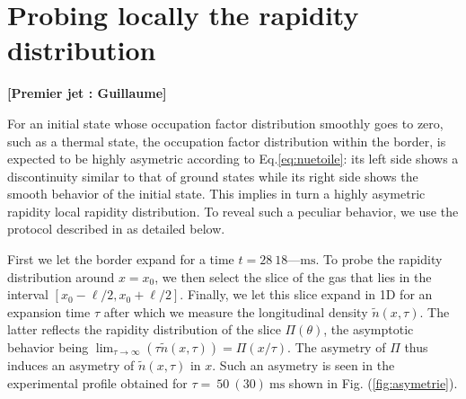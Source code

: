 \documentclass[submission, Phys]{SciPost}
\begin{document}
\section{Probing locally the rapidity distribution}
{\bf [Premier jet : Guillaume]}
\label{sec:local}

\def\OliveGreen{OliveGreen}

For an initial state whose occupation factor distribution smoothly goes to zero, such as a thermal state, the occupation factor distribution within the border, is expected    to be highly asymetric according to Eq.\eqref{eq:nuetoile}:  its left side shows a discontinuity similar to that of ground states while its right side shows the smooth behavior of the initial state.  This implies in turn a highly asymetric rapidity local rapidity distribution.  
		To reveal such a peculiar behavior, we use the protocol described in \cite{dubois_probing_2024} as detailed below.
		
		First we let the border expand for a time $t=28~18— \mbox{ms}$. 
		To probe the rapidity distribution around $x=x_0$, we then select the slice of the gas that lies in the interval  $[x_0-\ell/2, x_0+\ell/2]$. Finally, we let this slice expand in 1D for an expansion time $\tau$  after which we measure the longitudinal density $\tilde{n}(x, {\tau} )$.  The latter reflects the rapidity distribution of the slice $\Pi(\theta)$, the asymptotic behavior being  $\lim_{\tau\rightarrow\infty} (\tau \tilde{n}(x, {\tau} )) =\Pi(x/\tau)$. The asymetry of $\Pi$ thus induces an asymetry of  $\tilde{n}(x,\tau)$ in $x$.
		Such an asymetry is seen in the experimental profile obtained for $\tau=~50~(30)~ \mbox{ms}$ shown in Fig. (\ref{fig:asymetrie}).
		
\end{document}
